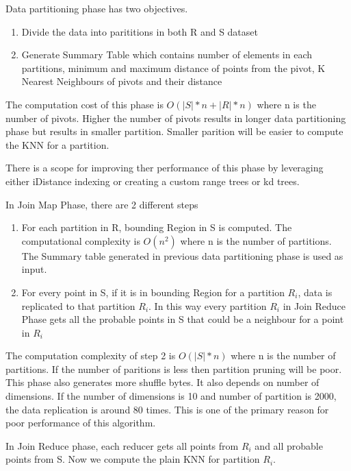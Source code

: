 \documentclass[conference]{IEEEtran}
\begin{document}
\bigskip

Data partitioning phase has two objectives.
\begin{enumerate}
\item Divide the data into parititions in both R and S dataset
\item Generate Summary Table which contains number of elements in each
  partitions, minimum and maximum distance of points from the pivot, K
  Nearest Neighbours of pivots and their distance
\end{enumerate}

\medskip

The computation cost of this phase is $O(|S|*n + |R|*n)$ where n is
the number of pivots. Higher the number of pivots results in longer
data partitioning phase but results in smaller partition. Smaller
parition will be easier to compute the KNN for a partition.

\medskip

There is a scope for improving ther performance of this phase by
leveraging either iDistance indexing \cite{jagadish_idistance:_2005}
or creating a custom range trees or kd trees.

\bigskip

In Join Map Phase, there are 2 different steps
\begin{enumerate}
\item For each partition in R, bounding Region in S is computed. The
  computational complexity is $O(n^2)$ where n is the number of
  partitions. The Summary table generated in previous data
  partitioning phase is used as input.
\item For every point in S, if it is in bounding Region for a
  partition $R_i$, data is replicated to that partition $R_i$. In this way
  every partition $R_i$ in Join Reduce Phase gets all the probable
  points in S that could be a neighbour for a point in $R_i$
\end{enumerate}

The computation complexity of step 2 is $O(|S| * n)$ where n is the
number of partitions. If the number of paritions is less then
partition pruning will be poor. This phase also generates more shuffle
bytes. It also depends on number of dimensions. If the number of
dimensions is 10 and number of partition is 2000, the data replication
is around 80 times. This is one of the primary reason for poor
performance of this algorithm.

\bigskip

In Join Reduce phase, each reducer gets all points from $R_i$ and all
probable points from S. Now we compute the plain KNN for partition
$R_i$.
\end{document}
